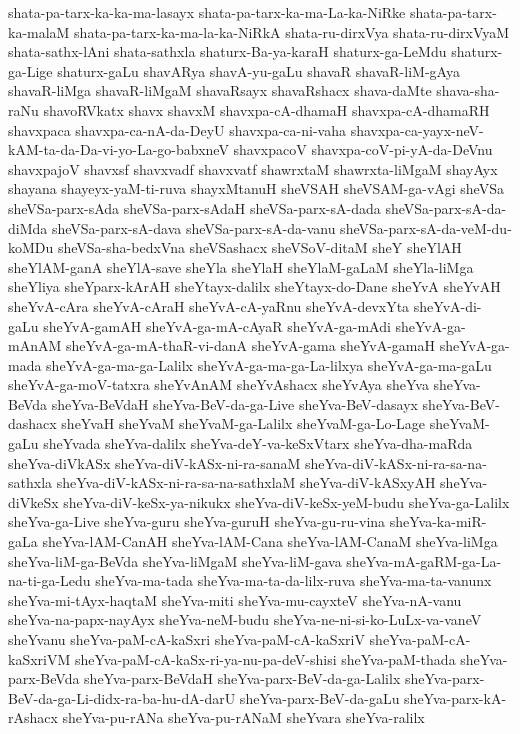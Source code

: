 {shata-pa-tarx-ka-ka-ma-lasayx
shata-pa-tarx-ka-ma-La-ka-NiRke
shata-pa-tarx-ka-malaM
shata-pa-tarx-ka-ma-la-ka-NiRkA
shata-ru-dirxVya
shata-ru-dirxVyaM
shata-sathx-lAni
shata-sathxla
shaturx-Ba-ya-karaH
shaturx-ga-LeMdu
shaturx-ga-Lige
shaturx-gaLu
shavARya
shavA-yu-gaLu
shavaR
shavaR-liM-gAya
shavaR-liMga
shavaR-liMgaM
shavaRsayx
shavaRshacx
shava-daMte
shava-sha-raNu
shavoRVkatx
shavx
shavxM
shavxpa-cA-dhamaH
shavxpa-cA-dhamaRH
shavxpaca
shavxpa-ca-nA-da-DeyU
shavxpa-ca-ni-vaha
shavxpa-ca-yayx-neV-kAM-ta-da-Da-vi-yo-La-go-babxneV
shavxpacoV
shavxpa-coV-pi-yA-da-DeVnu
shavxpajoV
shavxsf
shavxvadf
shavxvatf
shawrxtaM
shawrxta-liMgaM
shayAyx
shayana
shayeyx-yaM-ti-ruva
shayxMtanuH
sheVSAH
sheVSAM-ga-vAgi
sheVSa
sheVSa-parx-sAda
sheVSa-parx-sAdaH
sheVSa-parx-sA-dada
sheVSa-parx-sA-da-diMda
sheVSa-parx-sA-dava
sheVSa-parx-sA-da-vanu
sheVSa-parx-sA-da-veM-du-koMDu
sheVSa-sha-bedxVna
sheVSashacx
sheVSoV-ditaM
sheY
sheYlAH
sheYlAM-ganA
sheYlA-save
sheYla
sheYlaH
sheYlaM-gaLaM
sheYla-liMga
sheYliya
sheYparx-kArAH
sheYtayx-dalilx
sheYtayx-do-Dane
sheYvA
sheYvAH
sheYvA-cAra
sheYvA-cAraH
sheYvA-cA-yaRnu
sheYvA-devxYta
sheYvA-di-gaLu
sheYvA-gamAH
sheYvA-ga-mA-cAyaR
sheYvA-ga-mAdi
sheYvA-ga-mAnAM
sheYvA-ga-mA-thaR-vi-danA
sheYvA-gama
sheYvA-gamaH
sheYvA-ga-mada
sheYvA-ga-ma-ga-Lalilx
sheYvA-ga-ma-ga-La-lilxya
sheYvA-ga-ma-gaLu
sheYvA-ga-moV-tatxra
sheYvAnAM
sheYvAshacx
sheYvAya
sheYva
sheYva-BeVda
sheYva-BeVdaH
sheYva-BeV-da-ga-Live
sheYva-BeV-dasayx
sheYva-BeV-dashacx
sheYvaH
sheYvaM
sheYvaM-ga-Lalilx
sheYvaM-ga-Lo-Lage
sheYvaM-gaLu
sheYvada
sheYva-dalilx
sheYva-deY-va-keSxVtarx
sheYva-dha-maRda
sheYva-diVkASx
sheYva-diV-kASx-ni-ra-sanaM
sheYva-diV-kASx-ni-ra-sa-na-sathxla
sheYva-diV-kASx-ni-ra-sa-na-sathxlaM
sheYva-diV-kASxyAH
sheYva-diVkeSx
sheYva-diV-keSx-ya-nikukx
sheYva-diV-keSx-yeM-budu
sheYva-ga-Lalilx
sheYva-ga-Live
sheYva-guru
sheYva-guruH
sheYva-gu-ru-vina
sheYva-ka-miR-gaLa
sheYva-lAM-CanAH
sheYva-lAM-Cana
sheYva-lAM-CanaM
sheYva-liMga
sheYva-liM-ga-BeVda
sheYva-liMgaM
sheYva-liM-gava
sheYva-mA-gaRM-ga-La-na-ti-ga-Ledu
sheYva-ma-tada
sheYva-ma-ta-da-lilx-ruva
sheYva-ma-ta-vanunx
sheYva-mi-tAyx-haqtaM
sheYva-miti
sheYva-mu-cayxteV
sheYva-nA-vanu
sheYva-na-papx-nayAyx
sheYva-neM-budu
sheYva-ne-ni-si-ko-LuLx-va-vaneV
sheYvanu
sheYva-paM-cA-kaSxri
sheYva-paM-cA-kaSxriV
sheYva-paM-cA-kaSxriVM
sheYva-paM-cA-kaSx-ri-ya-nu-pa-deV-shisi
sheYva-paM-thada
sheYva-parx-BeVda
sheYva-parx-BeVdaH
sheYva-parx-BeV-da-ga-Lalilx
sheYva-parx-BeV-da-ga-Li-didx-ra-ba-hu-dA-darU
sheYva-parx-BeV-da-gaLu
sheYva-parx-kA-rAshacx
sheYva-pu-rANa
sheYva-pu-rANaM
sheYvara
sheYva-ralilx
}
